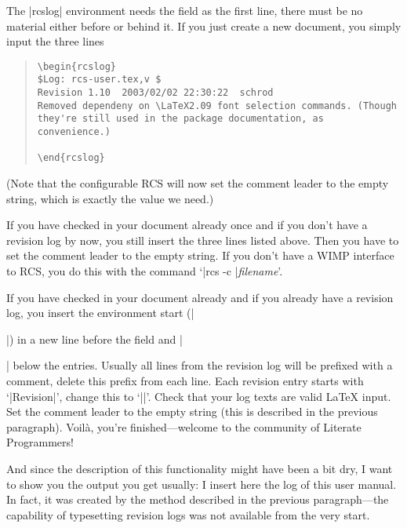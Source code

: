 \sect The |rcslog| environment needs the \Log{} field as the first
line, there must be no material either before or behind it. If you
just create a new document, you simply input the three lines
\begin{quote}
  \begin{verbatim}
\begin{rcslog}
$Log: rcs-user.tex,v $
Revision 1.10  2003/02/02 22:30:22  schrod
Removed dependeny on \LaTeX2.09 font selection commands. (Though
they're still used in the package documentation, as convenience.)

\end{rcslog}
  \end{verbatim}
\end{quote}
(Note that the configurable RCS will now set the comment leader to the
empty string, which is exactly the value we need.)

If you have checked in your document already once and if you don't
have a revision log by now, you still insert the three lines listed
above. Then you have to set the comment leader to the empty string.
If you don't have a WIMP interface to RCS, you do this with the
command `|rcs -c |\textit{filename}'.

If you have checked in your document already and if you already have a
revision log, you insert the environment start
(|\begin{rcslog}|) in a new line before the \Log{} field and
|\end{rcslog}| below the entries. Usually all lines from the revision
log will be prefixed with a comment, delete this prefix from each
line. Each revision entry starts with `|Revision|', change this to
`|\Revision|'. Check that your log texts are valid \LaTeX{} input.
Set the comment leader to the empty string (this is described in the
previous paragraph). Voil\`a, you're finished---welcome to the
community of Literate Programmers!


\sect And since the description of this functionality might have been
a bit dry, I want to show you the output you get usually: I insert
here the log of this user manual. In fact, it was created by the
method described in the previous paragraph---the capability of
typesetting revision logs was not available from the very start.

